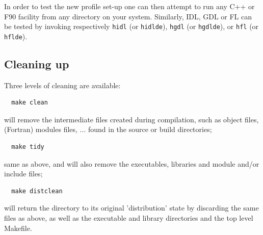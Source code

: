 \documentclass[12pt,twoside]{article}
\begin{document}
\begin{itemize}

\end{itemize}

In order to test the new \healpix profile set-up one can then attempt
to run any C++ or F90 facility from any directory on your system. Similarly,
IDL, GDL or FL can be tested by invoking respectively 
\texttt{hidl} (or \texttt{hidlde}),  \texttt{hgdl} (or \texttt{hgdlde}), or \texttt{hfl} (or \texttt{hflde}).



\subsection{Cleaning up}
Three levels of cleaning are available:
\begin{verbatim}
  make clean
\end{verbatim}
will remove the intermediate files created during compilation, such as object
files, (Fortran) modules files, ... found in the source or build directories;
\begin{verbatim}
  make tidy
\end{verbatim}
same as above, and will also remove the \healpix executables, libraries and module and/or
include files;
\begin{verbatim}
  make distclean
\end{verbatim}
will return the \healpix directory to its original 'distribution' state by discarding the same
files as above, as well as the executable and library directories and the top
level Makefile.
\end{document}
